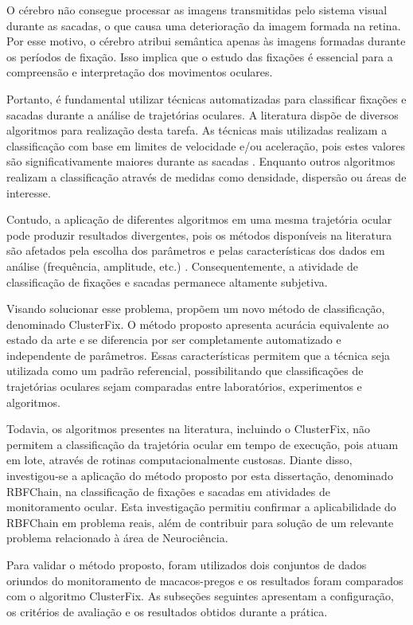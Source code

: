 \documentclass[msc, classic, a4paper]{ufbathesis}
\begin{document}
O cérebro não consegue processar as imagens transmitidas pelo sistema visual durante as sacadas, o que causa uma deterioração da imagem formada na retina.
Por esse motivo, o cérebro atribui semântica apenas às imagens formadas durante os períodos de fixação.
Isso implica que o estudo das fixações é essencial para a compreensão e interpretação dos movimentos oculares.

Portanto, é fundamental utilizar técnicas automatizadas para classificar fixações e sacadas durante a análise de trajetórias oculares.
A literatura dispõe de diversos algoritmos para realização desta tarefa.
As técnicas mais utilizadas realizam a classificação com base em limites de velocidade e/ou aceleração,
pois estes valores são significativamente maiores durante as sacadas \cite{Otero_Saccades_and_microsaccades}.
Enquanto outros algoritmos realizam a classificação através de medidas como densidade, dispersão ou áreas de interesse.

Contudo, a aplicação de diferentes algoritmos em uma mesma trajetória ocular pode produzir resultados divergentes, pois os métodos disponíveis na literatura são afetados pela escolha dos parâmetros e pelas características dos dados em análise (frequência, amplitude, etc.) \cite{KONIG2014121}.
Consequentemente, a atividade de classificação de fixações e sacadas permanece altamente subjetiva.

Visando solucionar esse problema,  propõem um novo método de classificação, denominado ClusterFix.
O método proposto apresenta acurácia equivalente ao estado da arte e se diferencia por ser completamente automatizado e independente de parâmetros.
Essas características permitem que a técnica seja utilizada como um padrão referencial,
possibilitando que classificações de trajetórias oculares sejam comparadas entre laboratórios, experimentos e algoritmos.

Todavia, os algoritmos presentes na literatura, incluindo o ClusterFix, não permitem a classificação da trajetória ocular em tempo de execução, pois atuam em lote, através de rotinas computacionalmente custosas.
Diante disso, investigou-se a aplicação do método proposto por esta dissertação, denominado RBFChain, na classificação de fixações e sacadas em atividades de monitoramento ocular.
Esta investigação permitiu confirmar a aplicabilidade do RBFChain em problema reais, além de contribuir para solução de um relevante problema relacionado à área de Neurociência.

Para validar o método proposto, foram utilizados dois conjuntos de dados oriundos do monitoramento de macacos-pregos e os resultados foram comparados com o algoritmo ClusterFix.
As subseções seguintes apresentam a configuração, os critérios de avaliação e os resultados obtidos durante a prática.
\end{document}
